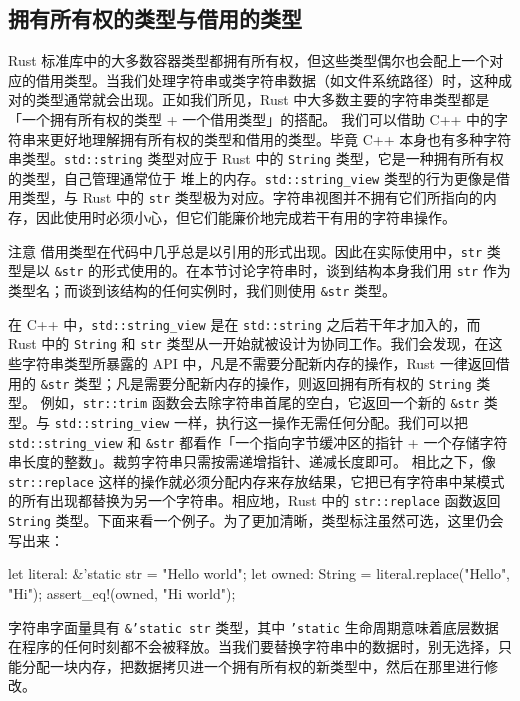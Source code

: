 \subsection{拥有所有权的类型与借用的类型}
\label{idx:idx_6a2446f0}
\label{idx:idx_f1c742d0}
Rust 标准库中的大多数容器类型都拥有所有权，但这些类型偶尔也会配上一个对应的借用类型。当我们处理字符串或类字符串数据（如文件系统路径）时，这种成对的类型通常就会出现。正如我们所见，Rust 中大多数主要的字符串类型都是「一个拥有所有权的类型 + 一个借用类型」的搭配。
\label{idx:idx_d97cb083}
我们可以借助 C++ 中的字符串来更好地理解拥有所有权的类型和借用的类型。毕竟 C++ 本身也有多种字符串类型。\texttt{std::string} 类型对应于 Rust 中的
\texttt{String} 类型，它是一种拥有所有权的类型，自己管理通常位于
堆上的内存。\texttt{std::\allowbreak{}string\_\allowbreak{}view} 类型的行为更像是借用类型，与 Rust 中的 \texttt{str} 类型极为对应。字符串视图并不拥有它们所指向的内存，因此使用时必须小心，但它们能廉价地完成若干有用的字符串操作。
\begin{myNotic}{注意}
借用类型在代码中几乎总是以引用的形式出现。因此在实际使用中，\texttt{str} 类型是以 \texttt{\&str} 的形式使用的。在本节讨论字符串时，谈到结构本身我们用 \texttt{str} 作为类型名；而谈到该结构的任何实例时，我们则使用 \texttt{\&str} 类型。
\end{myNotic}
在 C++ 中，\texttt{std::\allowbreak{}string\_\allowbreak{}view} 是在 \texttt{std::string} 之后若干年才加入的，而 Rust 中的 \texttt{String} 和
\texttt{str} 类型从一开始就被设计为协同工作。我们会发现，在这些字符串类型所暴露的
API 中，凡是不需要分配新内存的操作，Rust 一律返回借用的 \texttt{\&str} 类型；凡是需要分配新内存的操作，则返回拥有所有权的 \texttt{String} 类型。
例如，\texttt{str::trim} 函数会去除字符串首尾的空白，它返回一个新的 \texttt{\&str} 类型。与 \texttt{std::\allowbreak{}string\_\allowbreak{}view} 一样，执行这一操作无需任何分配。我们可以把 \texttt{std::\allowbreak{}string\_\allowbreak{}view} 和 \texttt{\&str} 都看作「一个指向字节缓冲区的指针 + 一个存储字符串长度的整数」。裁剪字符串只需按需递增指针、递减长度即可。
\label{idx:idx_0186ac47}
相比之下，像 \texttt{str::\allowbreak{}replace} 这样的操作就必须分配内存来存放结果，它把已有字符串中某模式的所有出现都替换为另一个字符串。相应地，Rust 中的 \texttt{str::\allowbreak{}replace} 函数返回 \texttt{String} 类型。下面来看一个例子。为了更加清晰，类型标注虽然可选，这里仍会写出来：
\begin{codebox}[rust]
let literal: &'static str = "Hello world";
let owned: String = literal.replace("Hello", "Hi");
assert_eq!(owned, "Hi world");
\end{codebox}
字符串字面量具有 \texttt{\&\allowbreak{}'static str} 类型，其中 \texttt{'static} 生命周期意味着底层数据在程序的任何时刻都不会被释放。当我们要替换字符串中的数据时，别无选择，只能分配一块内存，把数据拷贝进一个拥有所有权的新类型中，然后在那里进行修改。
